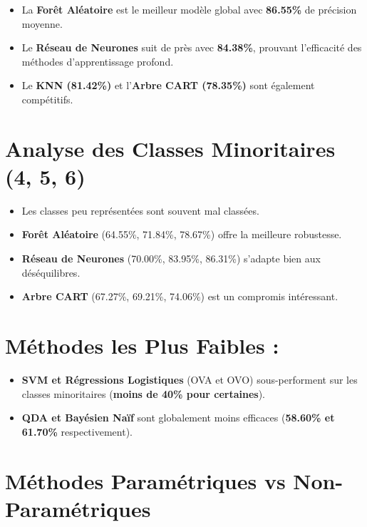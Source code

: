 \documentclass[
]{article}
\providecommand{\tightlist}{%
  \setlength{\itemsep}{0pt}\setlength{\parskip}{0pt}}\usepackage{longtable,booktabs,array}
\begin{document}
\begin{itemize}
\tightlist
\item
  La \textbf{Forêt Aléatoire} est le meilleur modèle global avec
  \textbf{86.55\%} de précision moyenne.
\item
  Le \textbf{Réseau de Neurones} suit de près avec \textbf{84.38\%},
  prouvant l'efficacité des méthodes d'apprentissage profond.
\item
  Le \textbf{KNN (81.42\%)} et l'\textbf{Arbre CART (78.35\%)} sont
  également compétitifs.
\end{itemize}

\section{Analyse des Classes Minoritaires (4, 5,
6)}\label{analyse-des-classes-minoritaires-4-5-6}

\begin{itemize}
\tightlist
\item
  Les classes peu représentées sont souvent mal classées.
\item
  \textbf{Forêt Aléatoire} (64.55\%, 71.84\%, 78.67\%) offre la
  meilleure robustesse.
\item
  \textbf{Réseau de Neurones} (70.00\%, 83.95\%, 86.31\%) s'adapte bien
  aux déséquilibres.
\item
  \textbf{Arbre CART} (67.27\%, 69.21\%, 74.06\%) est un compromis
  intéressant.
\end{itemize}

\section{Méthodes les Plus Faibles
:}\label{muxe9thodes-les-plus-faibles}

\begin{itemize}
\tightlist
\item
  \textbf{SVM et Régressions Logistiques} (OVA et OVO) sous-performent
  sur les classes minoritaires (\textbf{moins de 40\% pour certaines}).
\item
  \textbf{QDA et Bayésien Naïf} sont globalement moins efficaces
  (\textbf{58.60\% et 61.70\%} respectivement).
\end{itemize}

\section{Méthodes Paramétriques vs
Non-Paramétriques}\label{muxe9thodes-paramuxe9triques-vs-non-paramuxe9triques}
\end{document}
